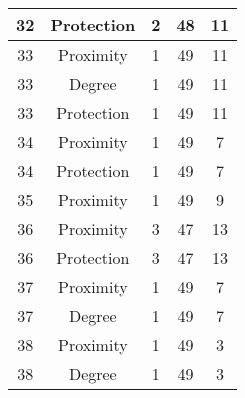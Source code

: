 \documentclass[results.tex]{subfiles}
\begin{document}
\begin{center}
\begin{tabular}{| c || c | c | c | c |}
            \hline
            32                      & Protection                   & 2                      & 48                      & 11                   \\
            \hline
            33                      & Proximity                    & 1                      & 49                      & 11                   \\
            \hline
            33                      & Degree                       & 1                      & 49                      & 11                   \\
            \hline
            33                      & Protection                   & 1                      & 49                      & 11                   \\
            \hline
            34                      & Proximity                    & 1                      & 49                      & 7                    \\
            \hline
            34                      & Protection                   & 1                      & 49                      & 7                    \\
            \hline
            35                      & Proximity                    & 1                      & 49                      & 9                    \\
            \hline
            36                      & Proximity                    & 3                      & 47                      & 13                   \\
            \hline
            36                      & Protection                   & 3                      & 47                      & 13                   \\
            \hline
            37                      & Proximity                    & 1                      & 49                      & 7                    \\
            \hline
            37                      & Degree                       & 1                      & 49                      & 7                    \\
            \hline
            38                      & Proximity                    & 1                      & 49                      & 3                    \\
            \hline
            38                      & Degree                       & 1                      & 49                      & 3                    \\

\end{tabular}
\end{center}
\end{document}
